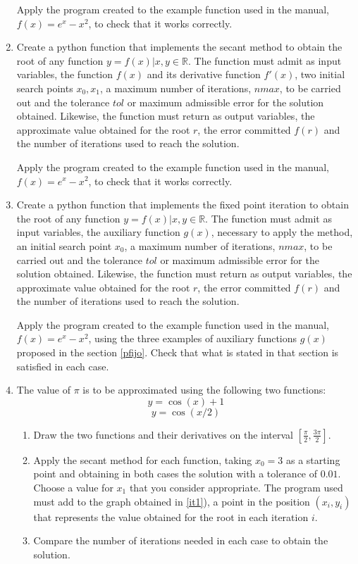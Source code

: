 \begin{paracol}{2}
\begin{enumerate}
Apply the program created to the example function used in the manual, $f(x) = e^x-x^2$, to check that it works correctly.

\item Create a python function that implements the secant method to obtain the root of any function $y = f(x)\vert x, y \in \mathbb{R}$. The function must admit as input variables, the function $f(x)$ and its derivative function $f'(x)$, two initial search points $x_0,x_1$, a maximum number of iterations, $nmax$, to be carried out and the tolerance $tol$ or maximum admissible error for the solution obtained. Likewise, the function must return as output variables, the approximate value obtained for the root $r$, the error committed $f(r)$ and the number of iterations used to reach the solution.

Apply the program created to the example function used in the manual, $f(x) = e^x-x^2$, to check that it works correctly.

\item Create a python function that implements the fixed point iteration to obtain the root of any function $y = f(x)\vert x, y \in \mathbb{R}$. The function must admit as input variables, the auxiliary function $g(x)$, necessary to apply the method, an initial search point $x_0$, a maximum number of iterations, $nmax$, to be carried out and the tolerance $tol$ or maximum admissible error for the solution obtained. Likewise, the function must return as output variables, the approximate value obtained for the root $r$, the error committed $f(r)$ and the number of iterations used to reach the solution.

Apply the program created to the example function used in the manual, $f(x) = e^x-x^2$, using the three examples of auxiliary functions $g(x)$ proposed in the section \ref{pfijo}. Check that what is stated in that section is satisfied in each case.

\item The value of $\pi$ is to be approximated using the following two functions:
\begin{equation*}
y=\cos(x)+1
\end{equation*}
\begin{equation*}
y=\cos(x/2)
\end{equation*}
\begin{enumerate}
\item \label{it1}Draw the two functions and their derivatives on the interval $[\frac{\pi}{2},\frac{3\pi}{2}]$.
\item Apply the secant method for each function, taking $x_0=3$ as a starting point and obtaining in both cases the solution with a tolerance of $0.01$. Choose a value for $x_1$ that you consider appropriate.
The program used must add to the graph obtained in \ref{it1}), a point in the position $(x_i,y_i)$ that represents the value obtained for the root in each iteration $i$.
\item Compare the number of iterations needed in each case to obtain the solution.
\end{enumerate}


\end{enumerate}
\end{paracol}
